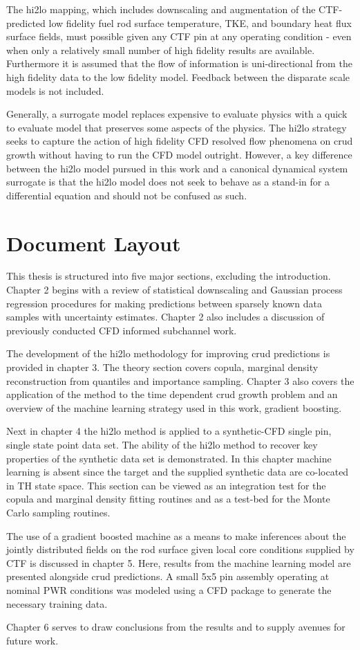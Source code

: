 The hi2lo mapping, which includes downscaling and augmentation of the CTF-predicted low fidelity fuel rod surface temperature, TKE, and boundary heat flux surface fields, must possible given any CTF pin at any operating condition - even when only a relatively small number of high fidelity results are available.  Furthermore it is assumed that the flow of information is uni-directional from the high fidelity data to the low fidelity model.  Feedback between the disparate scale models is not included.

Generally, a surrogate model replaces expensive to evaluate physics with a quick to evaluate model that preserves some aspects of the physics. The hi2lo strategy seeks to capture the action of high fidelity CFD resolved flow phenomena on crud growth without having to run the CFD model outright.  However, a key difference between the hi2lo model pursued in this work and a canonical dynamical system surrogate is that the hi2lo model does not seek to behave as a stand-in for a differential equation and should not be confused as such.  

\section{Document Layout}

This thesis is structured into five major sections, excluding the introduction.  Chapter 2 begins with a review of statistical downscaling and Gaussian process regression procedures for making predictions between sparsely known data samples with uncertainty estimates.  Chapter 2 also includes a discussion of previously conducted CFD informed subchannel work. 

The development of the hi2lo methodology for improving crud predictions is provided in chapter 3.  The theory section covers copula, marginal density reconstruction from quantiles and importance sampling.  Chapter 3 also covers the application of the method to the time dependent crud growth problem and an overview of the machine learning strategy used in this work, gradient boosting.   

Next in chapter 4 the hi2lo method is applied to a synthetic-CFD single pin, single state point data set.  The ability of the hi2lo method to recover key properties of the synthetic data set is demonstrated.   In this chapter machine learning is absent since the target and the supplied synthetic data are co-located in TH state space.  This section can be viewed as an integration test for the copula and marginal density fitting routines and as a test-bed for the Monte Carlo sampling routines.

The use of a gradient boosted machine as a means to make inferences about the jointly distributed fields on the rod surface given local core conditions supplied by CTF is discussed in chapter 5.  Here, results from the machine learning model are presented alongside crud predictions.  A small 5x5 pin assembly operating at nominal PWR conditions was modeled using a CFD package to generate the necessary training data.

Chapter 6 serves to draw conclusions from the results and to supply avenues for future work.   


